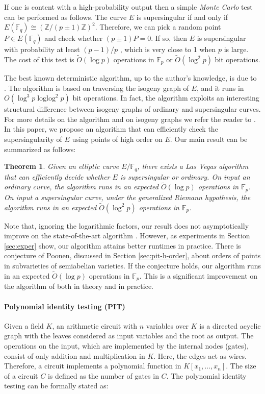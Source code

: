 \documentclass[12pt]{article}
\theoremstyle{plain}
\newtheorem{theorem}{Theorem}
\theoremstyle{definition}
\newcommand{\tildO}{\tilde{O}}
\DeclareMathOperator{\loglog}{loglog}
\def\Z{\ensuremath{\mathbb{Z}}}
\def\F{\ensuremath{\mathbb{F}}}
\begin{document}
If one is content with a high-probability output then a simple \textit{Monte Carlo} test can be 
performed as follows. The curve $E$ is supersingular if and only if $E(\F_q) \cong (\Z/(p \pm 
1)\Z)^2$. Therefore, we can pick a random point $P \in E(\F_q)$ and check whether $(p \pm 1)P = 0$. 
If so, then $E$ is supersingular with probability at least $(p - 1) / p$ \cite[Prop. 
2]{sutherland2012}, which is very close to 1 when $p$ is large. The cost of this test is 
$\tildO(\log p)$ operations in $\F_p$ or $\tildO(\log^2 p)$ bit operations.

The best known deterministic algorithm, up to the author's knowledge, is due to 
\cite{sutherland2012}. The algorithm is based on traversing the isogeny graph of $E$, and it runs 
in $O(\log^3p \loglog^2p)$ bit operations. In fact, the algorithm exploits an interesting 
structural difference between isogeny graphs of ordinary and supersingular curves. For more details 
on the algorithm and on isogeny graphs we refer the reader to \cite{sutherland2012, kohel1996}. In 
this paper, we propose an algorithm that can efficiently check the supersingularity of $E$ using 
points of high order on $E$. Our main result can be summarized as follows:
\begin{theorem}
	\label{theo:main}
	Given an elliptic curve $E/\F_q$, there exists a Las Vegas algorithm that can efficiently
	decide whether $E$ is supersingular or ordinary. On input an ordinary curve, the algorithm runs 
	in an expected $\tildO(\log p)$ operations in $\F_p$. On input a supersingular curve, under the 
	generalized Riemann hypothesis, the algorithm runs in an expected $\tildO(\log^2 p)$ operations 
	in $\F_p$.
\end{theorem}
Note that, ignoring the logarithmic factors, our result does not asymptotically improve on the 
state-of-the-art algorithm \cite{sutherland2012}. However, as experiments in Section 
\ref{sec:exper} show, our algorithm attains better runtimes in practice. There is conjecture of 
Poonen, discussed in Section \ref{sec:pit-h-order}, about orders of points in subvarieties of 
semiabelian varieties. If the conjecture holds, our algorithm runs in an expected $\tildO(\log p)$ 
operations in $\F_p$. This is a significant improvement on the algorithm of \cite{sutherland2012} 
both in theory and in practice.

\paragraph{Polynomial identity testing (PIT)}
Given a field $K$, an arithmetic circuit with $n$ variables over $K$ is a directed acyclic graph 
with the leaves considered as input variables and the root as output. The operations on the input, 
which are implemented by the internal nodes (gates), consist of only addition and multiplication in 
$K$. Here, the edges act as wires. Therefore, a circuit implements a polynomial function in $K[x_1, 
\dots, x_n]$. The size of a circuit $C$ is defined as the number of gates in $C$. The polynomial 
identity testing can be formally stated as: 
\end{document}
